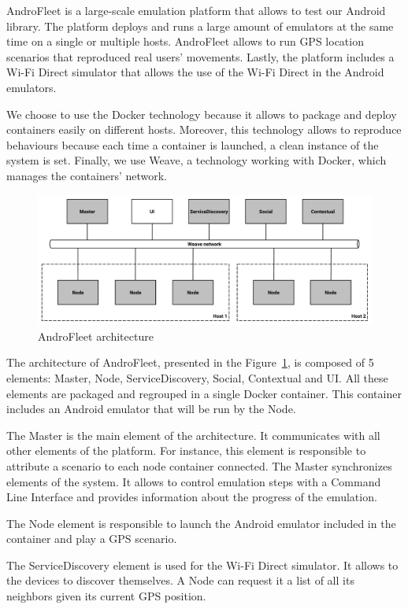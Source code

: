 AndroFleet is a large-scale emulation platform that allows to test our Android library.
The platform deploys and runs a large amount of emulators at the same time on a single or multiple hosts.
AndroFleet allows to run GPS location scenarios that reproduced real users' movements.
Lastly, the platform includes a Wi-Fi Direct simulator that allows the use of the Wi-Fi Direct in the Android emulators.

We choose to use the Docker technology because it allows to package and deploy containers easily on different hosts.
Moreover, this technology allows to reproduce behaviours because each time a container is launched, a clean instance of the system is set.
Finally, we use Weave, a technology working with Docker, which manages the containers' network.

\begin{figure}[h]
	\centering
	\includegraphics[width=\textwidth]{figures/androfleet}
	\caption{\label{AndroFleet} AndroFleet architecture}
\end{figure}

The architecture of AndroFleet, presented in the Figure~\ref{AndroFleet}, is composed of 5 elements: Master, Node, ServiceDiscovery, Social, Contextual and UI.
All these elements are packaged and regrouped in a single Docker container.
This container includes an Android emulator that will be run by the Node.

The Master is the main element of the architecture.
It communicates with all other elements of the platform.
For instance, this element is responsible to attribute a scenario to each node container connected.
The Master synchronizes elements of the system.
It allows to control emulation steps with a Command Line Interface and provides information about the progress of the emulation.

The Node element is responsible to launch the Android emulator included in the container and play a GPS scenario.

The ServiceDiscovery element is used for the Wi-Fi Direct simulator.
It allows to the devices to discover themselves.
A Node can request it a list of all its neighbors given its current GPS position.

